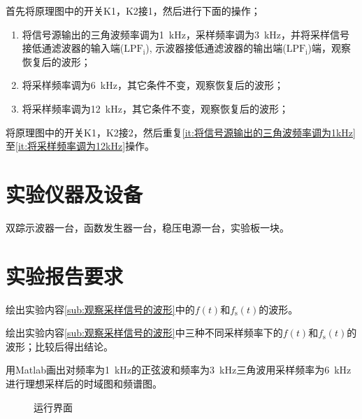 首先将原理图中的开关K1，K2接1，然后进行下面的操作；

\begin{enumerate}
	\item\label{it:将信号源输出的三角波频率调为1kHz}将信号源输出的三角波频率调为\SI{1}{kHz}，采样频率调为\SI{3}{kHz}，并将采样信号 接低通滤波器的输入端($ \text{LPF}_\text{i} $), 示波器接低通滤波器的输出端($ \text{LPF}_\text{i} $)端，观察恢复后的波形；
	\item 将采样频率调为\SI{6}{kHz}，其它条件不变，观察恢复后的波形；
	\item\label{it:将采样频率调为12kHz}将采样频率调为\SI{12}{kHz}，其它条件不变，观察恢复后的波形；
\end{enumerate}

将原理图中的开关K1，K2接2，然后重复\ref{it:将信号源输出的三角波频率调为1kHz}至\ref{it:将采样频率调为12kHz}操作。

\section{实验仪器及设备}%
\label{sec:实验仪器及设备\arabic{chapter}}

双踪示波器一台，函数发生器一台，稳压电源一台，实验板一块。

\section{实验报告要求}%
\label{sec:实验报告要求\arabic{chapter}}

\begin{Exercise}
	绘出实验内容\ref{sub:观察采样信号的波形}中的$ f(t) $和$ f_\text{s}(t) $的波形。
\end{Exercise}

\begin{Exercise}
	绘出实验内容\ref{sub:观察采样信号的波形}中三种不同采样频率下的$ f(t) $和$ f_\text{s}(t) $的波形；比较后得出结论。
\end{Exercise}

\begin{Exercise}
	用Matlab画出对频率为\SI{1}{kHz}的正弦波和频率为\SI{3}{kHz}三角波用采样频率为\SI{6}{kHz}进行理想采样后的时域图和频谱图。
\end{Exercise}


\begin{figure}[htpb]
	\centering
	\caption{运行界面}
	\label{fig:运行界面code473.m}
\end{figure}


